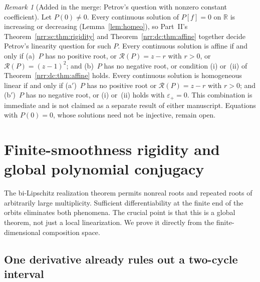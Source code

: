 \documentclass[11pt,letterpaper]{article}
\theoremstyle{definition}
\theoremstyle{remark}
\newtheorem{remark}[theorem]{Remark}
\newcommand{\R}{\mathbb R}
\newcommand{\core}{\mathcal R}
\begin{document}
\begin{remark}[Added in the merge: Petrov's question with nonzero constant coefficient]
\label{nrr:dc:rem:petrov}
Let $P(0)\ne0$. Every continuous solution of $P[f]=0$ on $\R$ is increasing
or decreasing (Lemma~\ref{lem:homeo}), so Part~II's
Theorem~\ref{nrr:sc:thm:rigidity} and Theorem~\ref{nrr:dc:thm:affine} together
decide Petrov's linearity question \cite{Petrov2016} for such $P$. Every
continuous solution is affine if and only if (a)~$P$ has no positive root, or
$\core(P)=z-r$ with $r>0$, or $\core(P)=(z-1)^2$; and (b)~$P$ has no negative
root, or condition (i) or~(ii) of Theorem~\ref{nrr:dc:thm:affine} holds.
Every continuous solution is homogeneous linear if and only if (a$'$)~$P$ has
no positive root or $\core(P)=z-r$ with $r>0$; and (b$'$)~$P$ has no negative
root, or (i) or~(ii) holds with $\varepsilon_+=0$. This combination is
immediate and is not claimed as a separate result of either manuscript.
Equations with $P(0)=0$, whose solutions need not be injective, remain open.
\end{remark}

\section{Finite-smoothness rigidity and global polynomial conjugacy}
\label{nrr:dc:sec:smooth}

The bi-Lipschitz realization theorem permits nonreal roots and repeated
roots of arbitrarily large multiplicity. Sufficient differentiability
at the finite end of the orbits eliminates both phenomena. The crucial
point is that this is a global theorem, not just a local linearization.
We prove it directly from the finite-dimensional composition space.

\subsection{One derivative already rules out a two-cycle interval}
\end{document}

